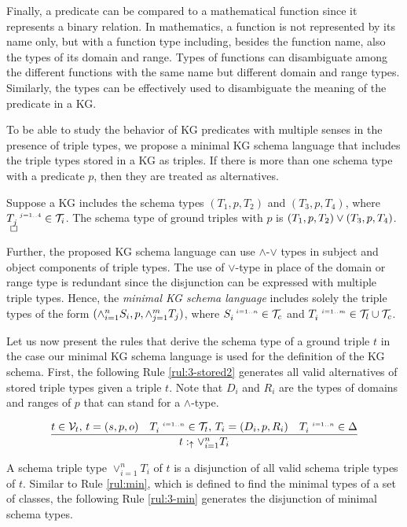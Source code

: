 \documentclass[runningheads]{llncs}
\newcommand{\s}{\scriptscriptstyle\ \,}
\newcommand{\uarr}{\uparrow}
\newcommand{\V}{{\cal V}}
\newcommand{\T}{{\cal T}}
\newcommand{\finbox}{\phantom{.}\hfill\Box}
\begin{document}
Finally, a predicate can be compared to a mathematical function since
it represents a binary relation. In mathematics, a function is not
represented by its name only, but with a function type including,
besides the function name, also the types of its domain and
range. Types of functions can disambiguate among the different
functions with the same name but different domain and range
types. Similarly, the types can be effectively used to disambiguate
the meaning of the predicate in a KG.

To be able to study the behavior of KG predicates with multiple senses
in the presence of triple types, we propose a minimal KG schema
language that includes the triple types stored in a KG as triples. If
there is more than one schema type with a predicate $p$, then they are
treated as alternatives.

\begin{example}
  Suppose a KG includes the schema types $(T_1,p,T_2)$ and
  $(T_3,p,T_4)$, where $T_j^{\s\/j=1..4}\in\T_i$. The schema type of
  ground triples with  $p$ is
  $(T_1,p,T_2)\lor\/(T_3,p,T_4)$. $\finbox$
\end{example}

Further, the proposed KG schema language can use $\land$-$\lor$ types
in subject and object components of triple types. The use of
$\lor$-type in place of the domain or range type is redundant since
the disjunction can be expressed with multiple triple types. Hence,
the \emph{minimal KG schema language} includes solely the triple types
of the form $(\land_{i=1}^n\/S_i,p,\land_{j=1}^m\/T_j)$, where
$S_i^{\s\/i=1..n}\in\T_c$ and $T_i^{\s\/i=1..m}\in\T_l\cup\T_c$.

Let us now present the rules that derive the schema type of a ground
triple $t$ in the case our minimal KG schema language is used for the
definition of the KG schema. First, the following Rule
\ref{rul:3-stored2} generates all valid alternatives of stored triple
types given a triple $t$. Note that $D_i$ and $R_i$ are the types of
domains and ranges of $p$ that can stand for a $\land$-type.

\begin{equation}
\label{rul:3-stored2}
\dfrac{t\in\V_t,\, t=(s,p,o)\quad T_i^{\s\/i=1..n}\in\T_t,\, T_i=(D_i,p,R_i)\quad\/T_i^{\s\/i=1..n}\in\Delta}
      {t:_\uarr\/\lor_{i=1}^n\/T_i}
\end{equation}

A schema triple type $\lor_{i=1}^nT_i$ of $t$ is a disjunction of
all valid schema triple types of $t$. Similar to Rule \ref{rul:min},
which is defined to find the minimal types of a set of classes, the
following Rule \ref{rul:3-min} generates the disjunction of minimal
schema types.
\end{document}
